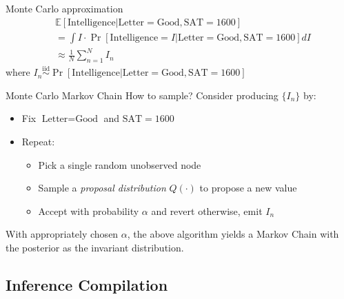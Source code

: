 \begin{frame}[fragile]{Monte Carlo approximation}
\begin{align*}
    &\mathbb{E}[\text{Intelligence} | \text{Letter}=\text{Good}, \text{SAT}=1600] \\
    &= \int I \cdot \Pr[\text{Intelligence}=I | \text{Letter}=\text{Good}, \text{SAT}=1600] dI \\
    &\approx \frac{1}{N} \sum_{n=1}^N I_n
\end{align*}
where $I_n \overset{\text{iid}}{\sim} \Pr[\text{Intelligence} | \text{Letter}=\text{Good}, \text{SAT}=1600]$

\end{frame}

\begin{frame}[fragile]{Monte Carlo Markov Chain}
    How to sample? Consider producing $\{I_n\}$ by:
    \begin{itemize}
        \item Fix $\text{Letter}=\text{Good}$ and $\text{SAT}=1600$
        \item Repeat:
        \begin{itemize}
            \item Pick a single random unobserved node
            \item Sample a \emph{proposal distribution} $Q(\cdot)$ to propose a new value
            \item Accept with probability $\alpha$ and revert otherwise, emit $I_n$
        \end{itemize}
    \end{itemize}
    
    \begin{theorem}
        With appropriately chosen $\alpha$, the above algorithm yields
        a Markov Chain with the posterior as the invariant distribution.
    \end{theorem}
\end{frame}

\subsection{Inference Compilation}

